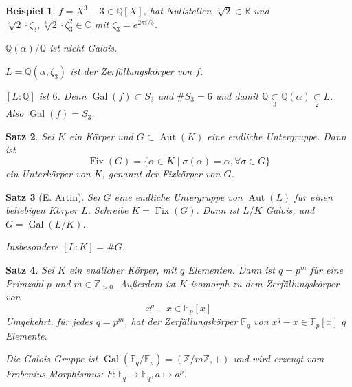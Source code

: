 \documentclass[a4paper,12pt,numbers=noenddot,parskip=full]{scrartcl}
\newcommand{\setZ}{\mathbb{Z}}
\newcommand{\setQ}{\mathbb{Q}}
\newcommand{\setR}{\mathbb{R}}
\newcommand{\setC}{\mathbb{C}}
\DeclareMathOperator{\Gal}{Gal}
\theoremstyle{dotless}
\newtheorem{theorem}{Satz}[section]
\newtheorem{example}[theorem]{Beispiel}
\theoremstyle{remark}
\begin{document}
	\begin{example}
		$f = X^3 - 3 \in \setQ[X]$, hat Nullstellen $\sqrt[3]{2} \in \setR$ und $\sqrt[3]{2} \cdot \zeta_3, \sqrt[3]{2} \cdot \zeta_3^2 \in \setC$ mit $\zeta_3 = e^{2\pi i / 3}$.
		
		$\setQ(\alpha) / \setQ$ ist nicht Galois.
		
		$L = \setQ(\alpha, \zeta_3)$ ist der Zerfällungskörper von $f$.
		
		$[L:\setQ]$ ist $6$. Denn $\Gal(f) \subset S_3$ und $\#S_3 = 6$ und damit $\setQ \underset{3}{\subset} \setQ(\alpha) \underset{2}{\subset} L$. Also $\Gal(f) = S_3$.
	\end{example}

	\begin{theorem}
		Sei $K$ ein Körper und $G \subset \operatorname{Aut}(K)$ eine endliche Untergruppe. Dann ist
		\begin{equation*}
			\operatorname{Fix}(G) = \{ \alpha \in K \mid \sigma(\alpha) = \alpha, \forall \sigma \in G \}
		\end{equation*}
		ein Unterkörper von $K$, genannt der Fixkörper von $G$.
	\end{theorem}

	\begin{theorem}[E. Artin]
		Sei $G$ eine endliche Untergruppe von $\operatorname{Aut}(L)$ für einen beliebigen Körper $L$. Schreibe $K = \operatorname{Fix}(G)$. Dann ist $L/K$ Galois, und $G = \Gal(L/K)$.
		
		Insbesondere $[L:K] = \#G$.
	\end{theorem}

	\begin{theorem}
		Sei $K$ ein endlicher Körper, mit $q$ Elementen. Dann ist $q = p^m$ für eine Primzahl $p$ und $m \in \setZ_{>0}$. Außerdem ist $K$ isomorph zu dem Zerfällungskörper von
		\begin{equation*}
			x^q - x \in \mathbb{F}_p[x]
		\end{equation*}
		Umgekehrt, für jedes $q = p^m$, hat der Zerfällungskörper $\mathbb{F}_q$ von $x^q - x \in \mathbb{F}_p[x]$ $q$ Elemente.
		
		Die Galois Gruppe ist $\Gal(\mathbb{F}_q / \mathbb{F}_p) = (\setZ / m \setZ, +)$ und wird erzeugt vom Frobenius-Morphismus: $F: \mathbb{F}_q \to \mathbb{F}_q, a \mapsto a^p$.
	\end{theorem}
\end{document}
